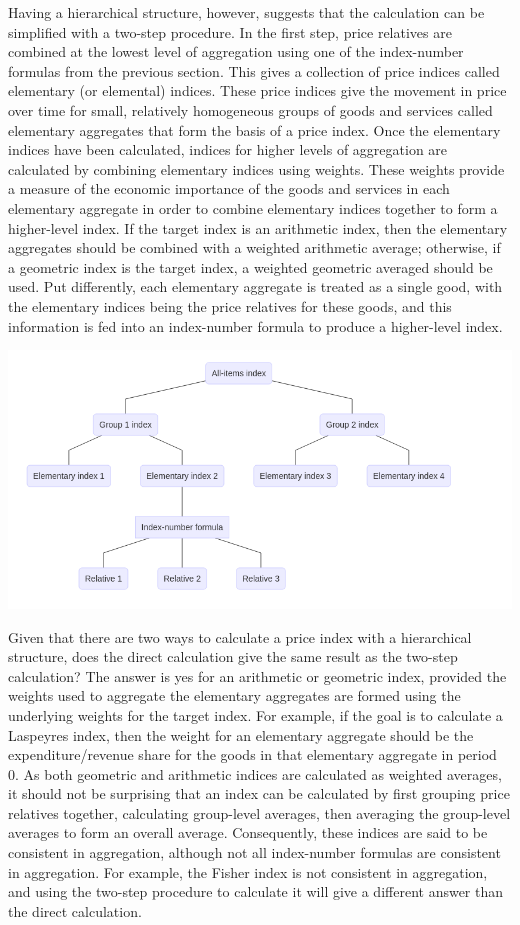 \documentclass[]{article}
\begin{document}
Having a hierarchical structure, however, suggests that the calculation can be simplified with a two-step procedure. In the first step, price relatives are combined at the lowest level of aggregation using one of the index-number formulas from the previous section. This gives a collection of price indices called elementary (or elemental) indices. These price indices give the movement in price over time for small, relatively homogeneous groups of goods and services called elementary aggregates that form the basis of a price index. Once the elementary indices have been calculated, indices for higher levels of aggregation are calculated by combining elementary indices using weights. These weights provide a measure of the economic importance of the goods and services in each elementary aggregate in order to combine elementary indices together to form a higher-level index. If the target index is an arithmetic index, then the elementary aggregates should be combined with a weighted arithmetic average; otherwise, if a geometric index is the target index, a weighted geometric averaged should be used. Put differently, each elementary aggregate is treated as a single good, with the elementary indices being the price relatives for these goods, and this information is fed into an index-number formula to produce a higher-level index.

\includegraphics{img/plot2.png}

Given that there are two ways to calculate a price index with a hierarchical structure, does the direct calculation give the same result as the two-step calculation? The answer is yes for an arithmetic or geometric index, provided the weights used to aggregate the elementary aggregates are formed using the underlying weights for the target index. For example, if the goal is to calculate a Laspeyres index, then the weight for an elementary aggregate should be the expenditure/revenue share for the goods in that elementary aggregate in period 0. As both geometric and arithmetic indices are calculated as weighted averages, it should not be surprising that an index can be calculated by first grouping price relatives together, calculating group-level averages, then averaging the group-level averages to form an overall average. Consequently, these indices are said to be consistent in aggregation, although not all index-number formulas are consistent in aggregation. For example, the Fisher index is not consistent in aggregation, and using the two-step procedure to calculate it will give a different answer than the direct calculation.
\end{document}
